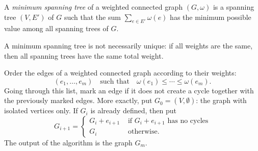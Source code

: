\begin{page}
\setcounter{section}{2}
\setcounter{subsection}{6}
\setcounter{dfn}{17}
\label{portion:305}

\begin{dfn}
A \emph{minimum spanning tree} of a weighted connected graph $(G, \omega)$ is a spanning tree $(V, E')$ of $G$ such that
the sum $\sum_{e \in E'} \omega(e)$ has the minimum possible value among all spanning trees of $G$.
\end{dfn}

\end{page}

\begin{page}
\setcounter{section}{2}
\setcounter{subsection}{6}
\setcounter{dfn}{17}
\label{portion:306}

A minimum spanning tree is not necessarily unique: if all weights are the same, then all spanning trees have the same total weight.


\end{page}

\begin{page}
\setcounter{section}{2}
\setcounter{subsection}{6}
\setcounter{dfn}{18}
\label{portion:308}

\begin{thm}
Order the edges of a weighted connected graph according to their weights:
\[
(e_1, \ldots, e_m) \quad \text{such that} \quad \omega(e_1) \le \cdots \le \omega(e_m).
\]
Going through this list, mark an edge if it does not create a cycle together with the previously marked edges.
More exactly, put $G_0 = (V, \emptyset)$: the graph with isolated vertices only.
If $G_i$ is already defined, then put
\[
G_{i+1} =
\begin{cases}
G_i + e_{i+1} &\text{ if } G_i + e_{i+1} \text{ has no cycles}\\
G_i &\text{ otherwise.}
\end{cases}
\]
The output of the algorithm is the graph $G_m$.
\end{thm}

\end{page}

